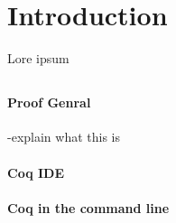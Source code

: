 
\section{Introduction}

Lore ipsum \cite{PACGGHSY}


\subsection{}


\paragraph{Proof Genral}
-explain what this is


\paragraph{Coq IDE}

\paragraph{Coq in the command line}



